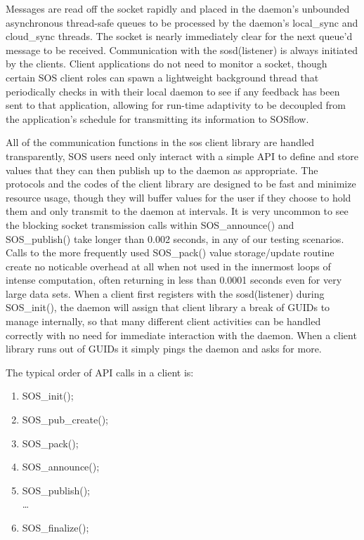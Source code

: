 Messages are read off the socket rapidly and placed in the daemon's
unbounded asynchronous thread-safe queues to be processed by the
daemon's local\_sync and cloud\_sync threads. The socket is nearly
immediately clear for the next queue'd message to be
received. Communication with the sosd(listener) is always initiated by
the clients.  Client applications do not need to monitor a socket,
though certain SOS client roles can spawn a lightweight background
thread that periodically checks in with their local daemon to see if
any feedback has been sent to that application, allowing for run-time
adaptivity to be decoupled from the application's schedule for
transmitting its information to SOSflow.

All of the communication functions in the sos client library are
handled transparently, SOS users need only interact with a simple API
to define and store values that they can then publish up to the daemon
as appropriate.  The protocols and the codes of the client library are
designed to be fast and minimize resource usage, though they will
buffer values for the user if they choose to hold them and only
transmit to the daemon at intervals.  It is very uncommon to see the
blocking socket transmission calls within SOS\_announce() and
SOS\_publish() take longer than 0.002 seconds, in any of our testing
scenarios. Calls to the more frequently used SOS\_pack() value storage/update
routine create no noticable overhead at all when not used in the
innermost loops of intense computation, often returning in less than
0.0001 seconds even for very large data sets. When a client first
registers with the sosd(listener) during SOS\_init(), the daemon will
assign that client library a break of GUIDs to manage internally, so
that many different client activities can be handled correctly with no
need for immediate interaction with the daemon. When a client library
runs out of GUIDs it simply pings the daemon and asks for more.

The typical order of API calls in a client is:
\begin{enumerate}
    \item SOS\_init();
    \item SOS\_pub\_create();
    \item SOS\_pack();
    \item SOS\_announce();
    \item SOS\_publish();\\
    \dots
    \item SOS\_finalize();
\end{enumerate}

